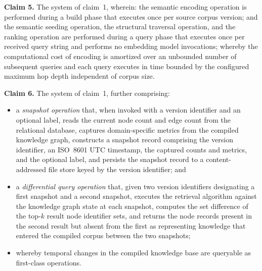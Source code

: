 \documentclass[12pt]{article}
\begin{document}
\bigskip
\noindent\textbf{Claim 5.}\quad
The system of claim~1, wherein: the semantic encoding operation is performed
during a build phase that executes once per source corpus version; and the
semantic seeding operation, the structural traversal operation, and the ranking
operation are performed during a query phase that executes once per received query
string and performs no embedding model invocations; whereby the computational
cost of encoding is amortized over an unbounded number of subsequent queries and
each query executes in time bounded by the configured maximum hop depth
independent of corpus size.

\bigskip
\noindent\textbf{Claim 6.}\quad
The system of claim~1, further comprising:
\begin{itemize}[leftmargin=2.5em]
  \item a \emph{snapshot operation} that, when invoked with a version identifier
    and an optional label, reads the current node count and edge count from the
    relational database, captures domain-specific metrics from the compiled
    knowledge graph, constructs a snapshot record comprising the version
    identifier, an ISO~8601 UTC timestamp, the captured counts and metrics, and
    the optional label, and persists the snapshot record to a content-addressed
    file store keyed by the version identifier; and
  \item a \emph{differential query operation} that, given two version identifiers
    designating a first snapshot and a second snapshot, executes the retrieval
    algorithm against the knowledge graph state at each snapshot, computes the
    set difference of the top-$k$ result node identifier sets, and returns the
    node records present in the second result but absent from the first as
    representing knowledge that entered the compiled corpus between the two
    snapshots;
  \item whereby temporal changes in the compiled knowledge base are queryable as
    first-class operations.
\end{itemize}
\end{document}
